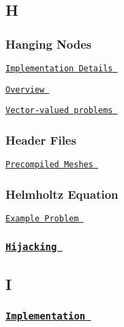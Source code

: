  \subsection*{ H }

 \subsubsection*{ Hanging Nodes }

 
\begin{DoxyItemize}
\item  \href{ ../../the_data_structure/html/index.html#Hanging_Nodes }{\tt Implementation Details }  
\item  \href{ ../../poisson/two_d_poisson_adapt/html/index.html#hang }{\tt Overview }  
\item  \href{ ../../navier_stokes/adaptive_driven_cavity/html/index.html#hang_vector }{\tt Vector-\/valued problems }  
\end{DoxyItemize} \subsubsection*{ Header Files }

 
\begin{DoxyItemize}
\item  \href{ ../../poisson/two_d_poisson/html/index.html#precompile_mesh }{\tt Precompiled Meshes }  
\end{DoxyItemize} \subsubsection*{ Helmholtz Equation }

 
\begin{DoxyItemize}
\item  \href{ ../../helmholtz/scattering/html/index.html }{\tt Example Problem }  
\end{DoxyItemize} \subsubsection*{ \href{ ../../navier_stokes/static_single_layer/html/index.html#hijack }{\tt Hijacking } }

 \subsection*{ I }

 \subsubsection*{ \href{ ../../the_data_structure/html/index.html }{\tt Implementation } }


